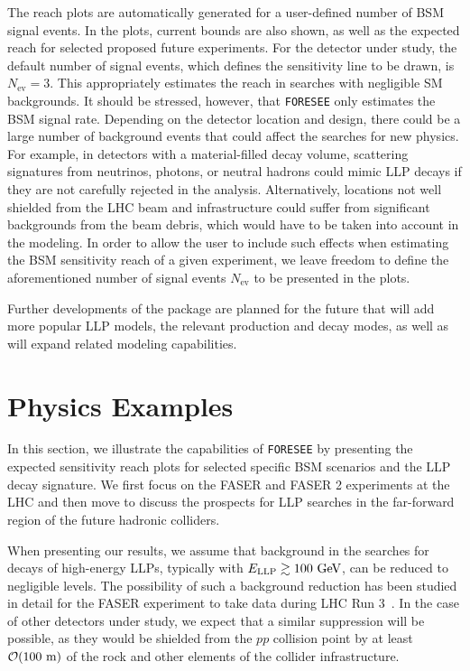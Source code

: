 \documentclass[prd,twocolumn,reprint,preprintnumbers,nofootinbib]{revtex4-1}
\begin{document}
The reach plots are automatically generated for a user-defined number of BSM signal events. In the plots, current bounds are also shown, as well as the expected reach for selected proposed future experiments. For the detector under study, the default number of signal events, which defines the sensitivity line to be drawn, is $N_{\textrm{ev}}=3$. This appropriately estimates the reach in searches with negligible SM backgrounds. It should be stressed, however, that \texttt{FORESEE} only estimates the BSM signal rate. Depending on the detector location and design, there could be a large number of background events that could affect the searches for new physics. For example, in detectors with a material-filled decay volume, scattering signatures from neutrinos, photons, or neutral hadrons could mimic LLP decays if they are not carefully rejected in the analysis. Alternatively, locations not well shielded from the LHC beam and infrastructure could suffer from significant backgrounds from the beam debris, which would have to be taken into account in the modeling. In order to allow the user to include such effects when estimating the BSM sensitivity reach of a given experiment, we leave freedom to define the aforementioned number of signal events $N_{\textrm{ev}}$ to be presented in the plots. 

Further developments of the package are planned for the future that will add more popular LLP models, the relevant production and decay modes, as well as will expand related modeling capabilities. 

\section{Physics Examples}
\label{sec:physics} 

In this section, we illustrate the capabilities of \texttt{FORESEE} by presenting the expected sensitivity reach plots for selected specific BSM scenarios and the LLP decay signature. We first focus on the FASER and FASER 2 experiments at the LHC and then move to discuss the prospects for LLP searches in the far-forward region of the future hadronic colliders. 

When presenting our results, we assume that background in the searches for decays of high-energy LLPs, typically with $E_{\textrm{LLP}}\gtrsim 100~\text{GeV}$, can be reduced to negligible levels. The possibility of such a background reduction has been studied in detail for the FASER experiment to take data during LHC Run 3~\cite{Ariga:2018zuc,Ariga:2018pin}. In the case of other detectors under study, we expect that a similar suppression will be possible, as they would be shielded from the $pp$ collision point by at least $\mathcal{O}(100~\text{m})$ of the rock and other elements of the collider infrastructure.
\end{document}
